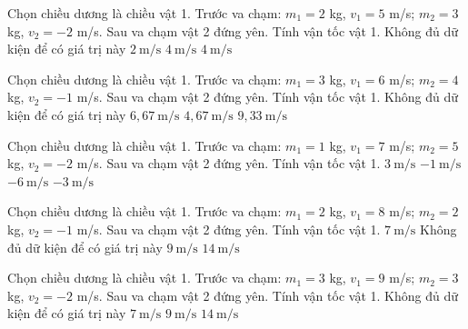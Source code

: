 \begin{ex}
Chọn chiều dương là chiều vật 1. Trước va chạm: $m_1=2$ kg, $v_1=5$ m/s; $m_2=3$ kg, $v_2=-2$ m/s. Sau va chạm vật 2 đứng yên. Tính vận tốc vật 1.
\choice
{Không đủ dữ kiện để có giá trị này}
{\True $2\ \mathrm{m/s}$}
{$4\ \mathrm{m/s}$}
{$4\ \mathrm{m/s}$}
\end{ex}

\begin{ex}
Chọn chiều dương là chiều vật 1. Trước va chạm: $m_1=3$ kg, $v_1=6$ m/s; $m_2=4$ kg, $v_2=-1$ m/s. Sau va chạm vật 2 đứng yên. Tính vận tốc vật 1.
\choice
{Không đủ dữ kiện để có giá trị này}
{$6,67\ \mathrm{m/s}$}
{\True $4,67\ \mathrm{m/s}$}
{$9,33\ \mathrm{m/s}$}
\end{ex}

\begin{ex}
Chọn chiều dương là chiều vật 1. Trước va chạm: $m_1=1$ kg, $v_1=7$ m/s; $m_2=5$ kg, $v_2=-2$ m/s. Sau va chạm vật 2 đứng yên. Tính vận tốc vật 1.
\choice
{$3\ \mathrm{m/s}$}
{$-1\ \mathrm{m/s}$}
{$-6\ \mathrm{m/s}$}
{\True $-3\ \mathrm{m/s}$}
\end{ex}

\begin{ex}
Chọn chiều dương là chiều vật 1. Trước va chạm: $m_1=2$ kg, $v_1=8$ m/s; $m_2=2$ kg, $v_2=-1$ m/s. Sau va chạm vật 2 đứng yên. Tính vận tốc vật 1.
\choice
{\True $7\ \mathrm{m/s}$}
{Không đủ dữ kiện để có giá trị này}
{$9\ \mathrm{m/s}$}
{$14\ \mathrm{m/s}$}
\end{ex}

\begin{ex}
Chọn chiều dương là chiều vật 1. Trước va chạm: $m_1=3$ kg, $v_1=9$ m/s; $m_2=3$ kg, $v_2=-2$ m/s. Sau va chạm vật 2 đứng yên. Tính vận tốc vật 1.
\choice
{Không đủ dữ kiện để có giá trị này}
{\True $7\ \mathrm{m/s}$}
{$9\ \mathrm{m/s}$}
{$14\ \mathrm{m/s}$}
\end{ex}

